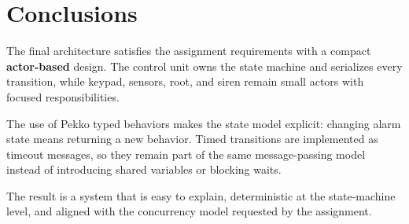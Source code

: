 \section{Conclusions}

The final architecture satisfies the assignment requirements with a compact \textbf{actor-based} design.
The control unit owns the state machine and serializes every transition, while keypad, sensors, root, and siren remain
small actors with focused responsibilities.

The use of Pekko typed behaviors makes the state model explicit: changing alarm state means returning a new behavior.
Timed transitions are implemented as timeout messages, so they remain part of the same message-passing model instead of
introducing shared variables or blocking waits.

The result is a system that is easy to explain, deterministic at the state-machine level, and aligned with the
concurrency model requested by the assignment.
